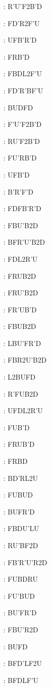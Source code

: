 \documentclass[9pt]{article}
\begin{document}
{\begin{multicols}{6}
: R'U'F2B'D

: FD'R2F'U

: UFB'R'D

: FRB'D

: FBDL2F'U

: FD'R'BF'U

: BUDFD

: F'U'F2B'D

: RU'F2B'D

: FU'RB'D

: UFB'D

: B'R'F'D

: FDFB'R'D

: FBU'B2D

: BFR'U'B2D

: FDL2R'U

: FRUB2D

: FRU'B2D

: FR'UB'D

: FBUB2D

: LBU'FR'D

: FBR2U'B2D

: L2BUFD

: R'FUB2D

: UFDL2R'U

: FUB'D

: FRUB'D

: FRBD

: BD'RL2U

: FUBUD

: BUFR'D

: FBDU'LU

: RU'BF2D

: FB'R'U'R2D

: FUBDRU

: FU'BUD

: BU'FR'D

: FBU'R2D

: BUFD

: BFD'LF2U

: BFDLF'U


\end{multicols}}
\end{document}

